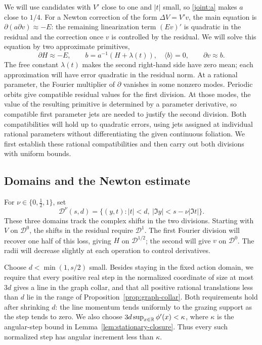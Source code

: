 We will use candidates with \(V'\) close to one and \(|t|\) small,
so \eqref{joint:a} makes \(a\) close to \(1/4\).  For a Newton
correction of the form \(\Delta V=V'v\), the main
equation is \(\partial(a\partial v)\approx-E\): the remaining
linearization term \((Ev)'\) is quadratic in the residual and the
correction once \(v\) is controlled by the residual.  We will solve
this equation by two approximate primitives,
\[
 \partial H\approx-E,\qquad
 b=a^{-1}(H+\lambda(t)),\quad \langle b\rangle=0,
 \qquad \partial v\approx b.
\]
The free constant \(\lambda(t)\) makes the second right-hand side
have zero mean; each approximation will have error quadratic in the
residual norm.  At a rational parameter, the Fourier multiplier of
\(\partial\) vanishes in some nonzero modes.  Periodic orbits give
compatible residual values for the first division.  At those modes,
the value of the resulting primitive is determined by a parameter
derivative, so compatible first parameter jets are needed to justify
the second division.  Both compatibilities will hold up to quadratic
errors, using jets assigned at individual rational parameters without
differentiating the given continuous foliation.  We first establish
these rational compatibilities and then carry out both divisions with
uniform bounds.

\subsection{Domains and the Newton estimate}

For \(\nu\in\{0,\tfrac12,1\}\), set
\begin{equation}
 \mathcal D^\nu(s,d)=
 \{(y,t):|t|<d,\ |\Im y|<s-\nu|\Im t|\}.
 \label{joint:domains}
\end{equation}
These three domains track the complex shifts in the two divisions.
Starting with \(V\) on \(\mathcal D^0\), the shifts in the residual
require \(\mathcal D^1\).  The first Fourier division will recover
one half of this loss, giving \(H\) on \(\mathcal D^{1/2}\); the
second will give \(v\) on \(\mathcal D^0\).  The radii will decrease
slightly at each operation to control derivatives.

Choose \(d<\min(1,s/2)\) small.  Besides staying in the fixed action domain,
we require that every positive real step in the normalized coordinate
of size at most \(3d\) gives a line in the graph collar, and that all
positive rational translations less than \(d\) lie in the range of
Proposition~\ref{prop:graph-collar}.  Both requirements hold after
shrinking \(d\): the line momentum tends uniformly to the grazing
support as the step tends to zero.
We also choose \(3d\sup_{x\in\mathbb{R}}\phi'(x)<\kappa\), where
\(\kappa\) is the angular-step bound in
Lemma~\ref{lem:stationary-closure}.  Thus every such normalized step
has angular increment less than \(\kappa\).

